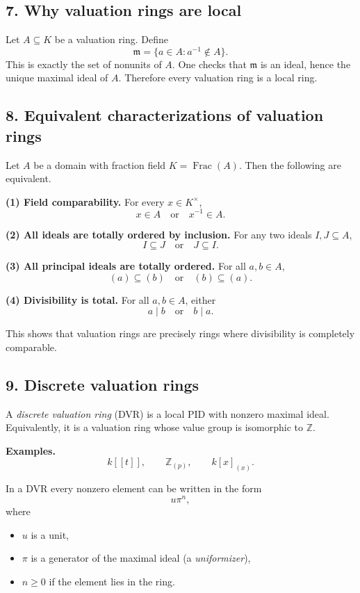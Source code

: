 \documentclass[12pt,a4paper]{article}
\theoremstyle{notespace}
\DeclareMathOperator{\Frac}{Frac}
\begin{document}
\subsection{7. Why valuation rings are local}

Let \(A\subseteq K\) be a valuation ring. Define
\[
\mathfrak m=\{a\in A : a^{-1}\notin A\}.
\]
This is exactly the set of nonunits of \(A\). One checks that \(\mathfrak m\) is an ideal, hence the unique maximal ideal of \(A\). Therefore every valuation ring is a local ring.

\subsection{8. Equivalent characterizations of valuation rings}

Let \(A\) be a domain with fraction field \(K=\Frac(A)\). Then the following are equivalent.

\textbf{(1) Field comparability.}
For every \(x\in K^\times\),
\[
x\in A \quad \text{or} \quad x^{-1}\in A.
\]

\textbf{(2) All ideals are totally ordered by inclusion.}
For any two ideals \(I,J\subseteq A\),
\[
I\subseteq J \quad \text{or} \quad J\subseteq I.
\]

\textbf{(3) All principal ideals are totally ordered.}
For all \(a,b\in A\),
\[
(a)\subseteq (b) \quad \text{or} \quad (b)\subseteq (a).
\]

\textbf{(4) Divisibility is total.}
For all \(a,b\in A\), either
\[
a\mid b \quad \text{or} \quad b\mid a.
\]

This shows that valuation rings are precisely rings where divisibility is completely comparable.

\subsection{9. Discrete valuation rings}

A \emph{discrete valuation ring} (DVR) is a local PID with nonzero maximal ideal. Equivalently, it is a valuation ring whose value group is isomorphic to \(\mathbb Z\).

\textbf{Examples.}
\[
k[[t]], \qquad \mathbb Z_{(p)}, \qquad k[x]_{(x)}.
\]

In a DVR every nonzero element can be written in the form
\[
u\pi^n,
\]
where
\begin{itemize}
	\item \(u\) is a unit,
	\item \(\pi\) is a generator of the maximal ideal (a \emph{uniformizer}),
	\item \(n\ge 0\) if the element lies in the ring.
\end{itemize}
\end{document}
